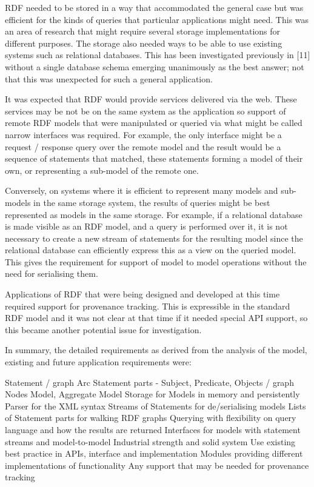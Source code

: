 \documentclass[11pt]{article}
\begin{document}
    RDF needed to be stored in a way that accommodated the general case but was efficient for the kinds of queries that particular applications might need. This was an area of research that might require several storage implementations for different purposes. The storage also needed ways to be able to use existing systems such as relational databases. This has been investigated previously in [11] without a single database schema emerging unanimously as the best answer; not that this was unexpected for such a general application.

    It was expected that RDF would provide services delivered via the web. These services may be not be on the same system as the application so support of remote RDF models that were manipulated or queried via what might be called narrow interfaces was required. For example, the only interface might be a request / response query over the remote model and the result would be a sequence of statements that matched, these statements forming a model of their own, or representing a sub-model of the remote one.

    Conversely, on systems where it is efficient to represent many models and sub-models in the same storage system, the results of queries might be best represented as models in the same storage. For example, if a relational database is made visible as an RDF model, and a query is performed over it, it is not necessary to create a new stream of statements for the resulting model since the relational database can efficiently express this as a view on the queried model. This gives the requirement for support of model to model operations without the need for serialising them.

    Applications of RDF that were being designed and developed at this time required support for provenance tracking. This is expressible in the standard RDF model and it was not clear at that time if it needed special API support, so this became another potential issue for investigation.

    In summary, the detailed requirements as derived from the analysis of the model, existing and future application requirements were:

    Statement / graph Arc
    Statement parts - Subject, Predicate, Objects / graph Nodes
    Model, Aggregate Model
    Storage for Models in memory and persistently
    Parser for the XML syntax
    Streams of Statements for de/serialising models
    Lists of Statement parts for walking RDF graphs
    Querying with flexibility on query language and how the results are returned
    Interfaces for models with statement streams and model-to-model
    Industrial strength and solid system
    Use existing best practice in APIs, interface and implementation
    Modules providing different implementations of functionality
    Any support that may be needed for provenance tracking
\end{document}
